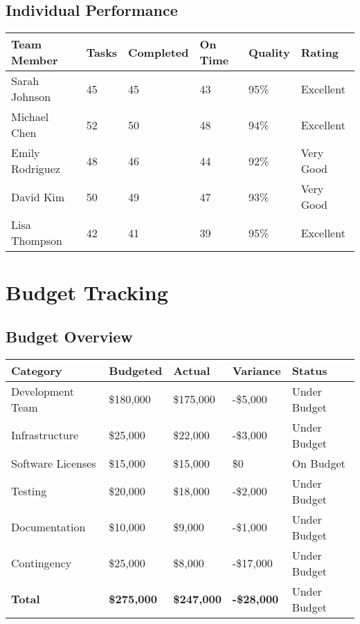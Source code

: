 \documentclass[12pt,a4paper]{article}
\begin{document}
\subsection{Individual Performance}
\begin{longtable}{|p{3cm}|p{2cm}|p{2cm}|p{2cm}|p{2cm}|p{3cm}|}
\hline
\rowcolor{lightgray}
\textbf{Team Member} & \textbf{Tasks} & \textbf{Completed} & \textbf{On Time} & \textbf{Quality} & \textbf{Rating} \\
\hline
Sarah Johnson & 45 & 45 & 43 & 95\% & Excellent \\
\hline
Michael Chen & 52 & 50 & 48 & 94\% & Excellent \\
\hline
Emily Rodriguez & 48 & 46 & 44 & 92\% & Very Good \\
\hline
David Kim & 50 & 49 & 47 & 93\% & Very Good \\
\hline
Lisa Thompson & 42 & 41 & 39 & 95\% & Excellent \\
\hline
\end{longtable}

\section{Budget Tracking}

\subsection{Budget Overview}
\begin{longtable}{|p{4cm}|p{3cm}|p{3cm}|p{3cm}|p{3cm}|}
\hline
\rowcolor{lightgray}
\textbf{Category} & \textbf{Budgeted} & \textbf{Actual} & \textbf{Variance} & \textbf{Status} \\
\hline
Development Team & \$180,000 & \$175,000 & -\$5,000 & \cellcolor{completedgreen}Under Budget \\
\hline
Infrastructure & \$25,000 & \$22,000 & -\$3,000 & \cellcolor{completedgreen}Under Budget \\
\hline
Software Licenses & \$15,000 & \$15,000 & \$0 & \cellcolor{completedgreen}On Budget \\
\hline
Testing & \$20,000 & \$18,000 & -\$2,000 & \cellcolor{completedgreen}Under Budget \\
\hline
Documentation & \$10,000 & \$9,000 & -\$1,000 & \cellcolor{completedgreen}Under Budget \\
\hline
Contingency & \$25,000 & \$8,000 & -\$17,000 & \cellcolor{completedgreen}Under Budget \\
\hline
\textbf{Total} & \textbf{\$275,000} & \textbf{\$247,000} & \textbf{-\$28,000} & \cellcolor{completedgreen}Under Budget \\
\hline
\end{longtable}
\end{document}
